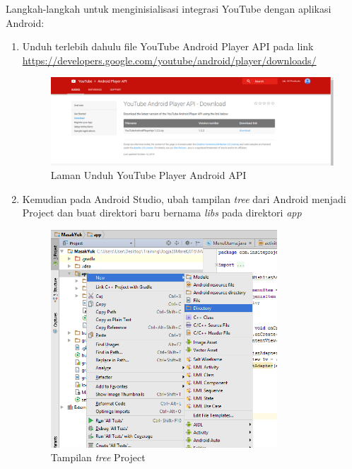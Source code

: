 	Langkah-langkah untuk menginisialisasi integrasi YouTube dengan aplikasi Android:
	\begin{enumerate}
		\item Unduh terlebih dahulu file YouTube Android Player API pada link 
		\url{https://developers.google.com/youtube/android/player/downloads/}
		\begin{figure}[H]
			\centering
			\includegraphics[width=1\textwidth]{gambar/y0}
			\caption{Laman Unduh YouTube Player Android API}
		\end{figure}
		
		\item Kemudian pada Android Studio, ubah tampilan \textit{tree} dari Android menjadi Project dan buat direktori baru bernama \textit{libs} pada direktori \textit{app}
		\begin{figure}[H]
			\centering
			\includegraphics[width=0.8\textwidth]{gambar/y2}
			\caption{Tampilan \textit{tree} Project}
		\end{figure}
		

\end{enumerate}
